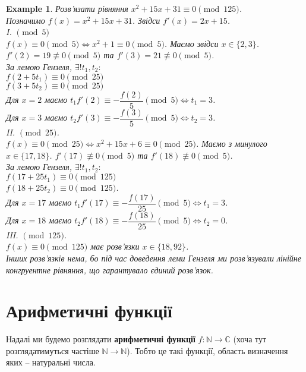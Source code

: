 \documentclass[a4paper, 14pt]{extarticle}
\theoremstyle{theoremdd}
\theoremstyle{theoremdd}
\theoremstyle{theoremdd}
\theoremstyle{theoremdd}
\newtheorem{example}[theorem]{Example}
\theoremstyle{theoremdd}
\theoremstyle{theoremdd}
\theoremstyle{theoremdd}
\theoremstyle{theoremdd}
\begin{document}
\begin{example}
Розв'язати рівняння $x^2+15x+31 \equiv 0 \pmod {125}$.\\
Позначимо $f(x) = x^2+15x+31$. Звідси $f'(x) = 2x+15$.
\medskip \\
I. $\pmod 5$
\medskip \\
$f(x) \equiv 0 \pmod 5 \iff x^2+1 \equiv 0 \pmod 5$. Маємо звідси $x \in \{2,3\}$.\\
$f'(2) = 19 \not\equiv 0 \pmod 5$ та $f'(3) = 21 \not\equiv 0 \pmod 5$.\\
За лемою Гензеля, $\exists! t_1,t_2:$\\
$f(2+5t_1) \equiv 0 \pmod {25}$\\
$f(3+5t_2) \equiv 0 \pmod {25}$\\
Для $x=2$ маємо $t_1f'(2) \equiv -\dfrac{f(2)}{5} \pmod 5 \iff t_1 = 3$.\\
Для $x=3$ маємо $t_2f'(3) \equiv -\dfrac{f(3)}{5} \pmod 5 \iff t_2 = 3$.
\medskip \\
II. $\pmod {25}$.
\medskip \\
$f(x) \equiv 0 \pmod {25} \iff x^2+15x+6 \equiv 0 \pmod {25}$. Маємо з минулого $x \in \{17,18\}$. $f'(17) \not\equiv 0 \pmod 5$ та $f'(18) \not\equiv 0 \pmod 5$.\\
За лемою Гензеля, $\exists !t_1,t_2:$\\
$f(17+25t_1) \equiv 0 \pmod {125}$\\
$f(18+25t_2) \equiv 0 \pmod {125}$.\\
Для $x = 17$ маємо $t_1f'(17) \equiv -\dfrac{f(17)}{25} \pmod 5 \iff t_1 = 3$.\\
Для $x = 18$ маємо $t_2f'(18) \equiv -\dfrac{f(18)}{25} \pmod 5 \iff t_2 = 0$.
\medskip \\
III. $\pmod {125}$.
\medskip \\
$f(x) \equiv 0 \pmod {125}$ має розв'язки $x \in \{18,92\}$. \\
Інших розв'язків нема, бо під час доведення леми Гензеля ми розв'язу\-вали лінійне конгруентне рівняння, що гарантувало єдиний розв'язок.
\end{example}
\newpage

\section{Арифметичні функції}
Надалі ми будемо розглядати \textbf{арифметичні функції} $f \colon \mathbb{N} \to \mathbb{C}$ (хоча тут розглядатимуться частіше $\mathbb{N} \to \mathbb{N}$). Тобто це такі функції, область визначення яких -- натуральні числа.
\end{document}
